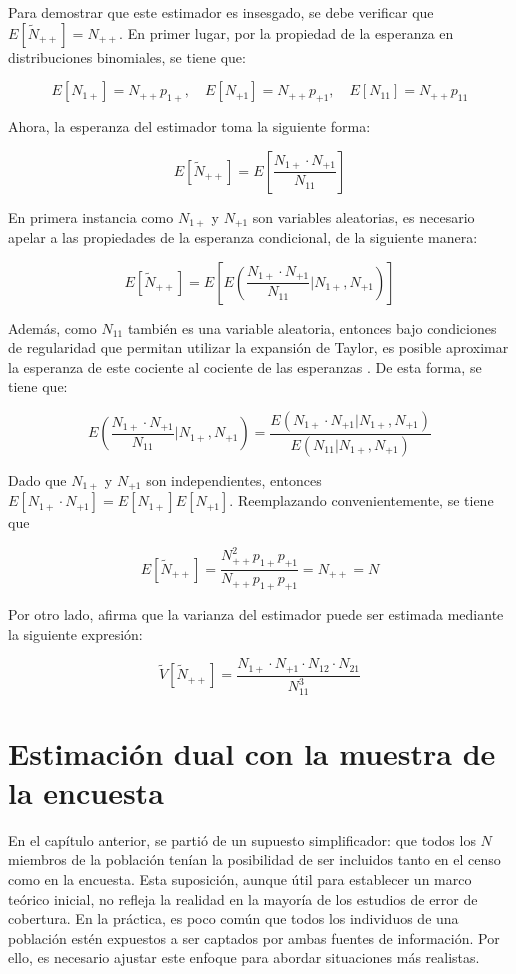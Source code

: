\documentclass[
  12pt,
]{book}
\begin{document}
Para demostrar que este estimador es insesgado, se debe verificar que \(E[\tilde{N}_{++}] = N_{++}\). En primer lugar, por la propiedad de la esperanza en distribuciones binomiales, se tiene que:

\[
E[N_{1+}] = N_{++} p_{1+}, \quad E[N_{+1}] = N_{++} p_{+1}, \quad E[N_{11}] = N_{++} p_{11}
\]

Ahora, la esperanza del estimador toma la siguiente forma:

\[
E[\tilde{N}_{++}] = E\left[ \frac{N_{1+} \cdot N_{+1}}{N_{11}} \right]
\]

En primera instancia como \(N_{1+}\) y \(N_{+1}\) son variables aleatorias, es necesario apelar a las propiedades de la esperanza condicional, de la siguiente manera:

\[
E[\tilde{N}_{++}] = E \left[ E \left( \frac{N_{1+} \cdot N_{+1}}{N_{11}} \Bigg| N_{1+}, N_{+1} \right) \right]
\]

Además, como \(N_{11}\) también es una variable aleatoria, entonces bajo condiciones de regularidad que permitan utilizar la expansión de Taylor, es posible aproximar la esperanza de este cociente al cociente de las esperanzas \citep{casella2002statistical}. De esta forma, se tiene que:

\[
E \left( \frac{N_{1+} \cdot N_{+1}}{N_{11}} \Bigg| N_{1+}, N_{+1} \right) =  \frac{E (N_{1+} \cdot N_{+1}| N_{1+}, N_{+1} )}{E (N_{11}| N_{1+}, N_{+1} )} 
\]

Dado que \(N_{1+}\) y \(N_{+1}\) son independientes, entonces \(E[N_{1+} \cdot N_{+1}] = E[N_{1+}] E[N_{+1}]\). Reemplazando convenientemente, se tiene que

\[
E[\tilde{N}_{++}] = \frac{N_{++}^2 p_{1+} p_{+1}}{N_{++} p_{1+} p_{+1}} 
= N_{++} = N
\]

Por otro lado, \citet{wolter1986coverage} afirma que la varianza del estimador puede ser estimada mediante la siguiente expresión:

\[
\tilde V[\tilde{N}_{++}] = \frac{N_{1+} \cdot N_{+1} \cdot N_{12} \cdot N_{21}  }{N_{11}^3}
\]

\chapter{Estimación dual con la muestra de la encuesta}\label{estimaciuxf3n-dual-con-la-muestra-de-la-encuesta}

En el capítulo anterior, se partió de un supuesto simplificador: que todos los \(N\) miembros de la población tenían la posibilidad de ser incluidos tanto en el censo como en la encuesta. Esta suposición, aunque útil para establecer un marco teórico inicial, no refleja la realidad en la mayoría de los estudios de error de cobertura. En la práctica, es poco común que todos los individuos de una población estén expuestos a ser captados por ambas fuentes de información. Por ello, es necesario ajustar este enfoque para abordar situaciones más realistas.
\end{document}
